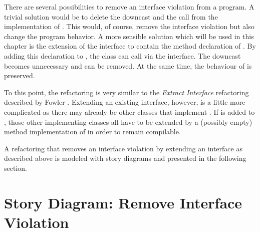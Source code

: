 There are several possibilities to remove an interface violation from a program. A trivial solution would be to delete the downcast and the call from the implementation of . This would, of course, remove the interface violation but also change the program behavior. A more sensible solution which will be used in this chapter is the extension of the interface  to contain the method declaration of . By adding this declaration to , the class  can call  via the interface. The downcast becomes unnecessary and can be removed. At the same time, the behaviour of  is preserved.

To this point, the refactoring is very similar to the \emph{Extract Interface} refactoring described by Fowler \cite{Fow99}. Extending an existing interface, however, is a little more complicated as there may already be other classes that implement . If  is added to , those other implementing classes all have to be extended by a (possibly empty) method implementation of  in order to remain compilable.

A refactoring that removes an interface violation by extending an interface as described above is modeled with story diagrams and presented in the following section.

\section{Story Diagram: Remove Interface Violation}


